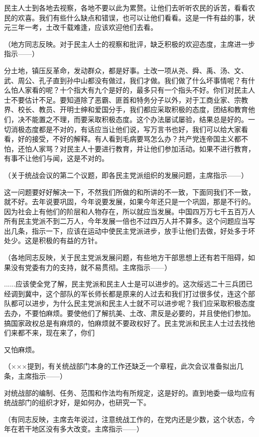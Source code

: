 民主人士到各地去视察，各地不要以此为累赘。让他们去听听农民的诉苦，看看农民的欢喜。我们有些什么缺点和错误，也可以让他们看看。这是一件有益的事，状元三年一考，土改千载难逢，应该欢迎他们去看。

（地方同志反映。对于民主人士的视察和批评，缺乏积极的欢迎态度，主席进一步指示——）

分土地，镇压反革命，发动群众，都是好事。土改一项从尧、舜、禹、汤、文、武、周公、孔子直到孙中山都没有做过，我们才做。我们做了什么坏事情呢？有什么怕人家看的呢？十个指大有九个是好的，最多只有一个指头不好。你们对民主人士不要估计不足。要知道除了恶霸、匪首和特务分子以外，对于工商业家、宗教界、校长、教员、开明士绅和爱国分手，我们都应采取积极的态度，团结和教育他们，决不能置之不理，而要采取积极态度。这个办法屡试屡验，结果总是好的。一切消极态度都是不对的，有话应当让他们说，写万言书也好，我们可以给大家看看，好的接受，不好的解释。有人看到毛病要骂怎么办？共产党连帝国主义都不怕，还怕人家骂？对民主人十要进行教育，并让他们参加活动。如果不进行教育，有事不让他们与闻，这是不对的。

（关于统战会议的第二个议题，即各民主党派组织的发展问题，主席指示——）

这一问题要好好解决一下，不然我们所做的和所讲的不一致，下面同我们不一致，就不好。去年说要巩固，今年说要发展，如果今年还只是一个巩固，那是不行的。因为社会上有他们的阶层和人物存在，所以就应当发展。中国四万万七千五百万人所有民主党派不到二万人，今年发展一倍也不过四万人并不算多。这个问题应当写出几条，指示一下，应该在运动中使民主党派进步，放手让他们去做，好处多于坏处少。这是积极的有益的方针。

（各地同志反映，关于民主党派发展问题，有些地方干部思想上还有若干阻碍，如果没有党委有力的支持，就不易贯彻。主席指示——）

......应该使全党了解，民主党派和民主人士是可以进步的。这次绥远二十三兵团已经调到冀中，这个部队的军长师长都是原来的人过去和我们打过很多仗，连这个部队都可以进步，为什么民主党派和民主人士就不可以进步呢？我们应采取积极态度去办，不要怕麻烦。要使他们了解抗美、土改、肃反是必要的，并且使他们参加。搞国家政权总是有麻烦的，怕麻烦就不要政权好了。民主党派和民主人士过去找他们来都不来，现在来了，你们

又怕麻烦。

（×××提到，有关统战部门本身的工作还缺乏一个章程，此次会议准备拟出几条，主席指示——）

对统战部的编制、任务、范围和作法均有所规定，这是好的。直到地委一级均应有统战部门的组织才好，是如何办，也研究一下。

（有同志反映，主席去年说过，注意统战工作的，在党内还是少数，这个状态，今年在若干地区没有多大改变。主席指示——）

